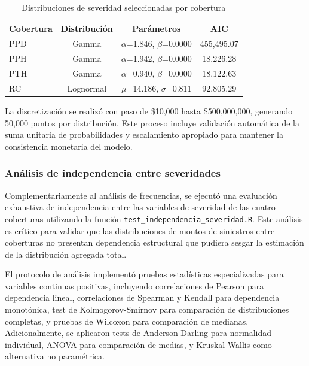 \begin{table}[H]
\centering
\caption{Distribuciones de severidad seleccionadas por cobertura}
\begin{tabular}{lccc}
\hline
\textbf{Cobertura} & \textbf{Distribución} & \textbf{Parámetros} & \textbf{AIC} \\
\hline
PPD & Gamma & $\alpha$=1.846, $\beta$=0.0000 & 455,495.07 \\
PPH & Gamma & $\alpha$=1.942, $\beta$=0.0000 & 18,226.28 \\
PTH & Gamma & $\alpha$=0.940, $\beta$=0.0000 & 18,122.63 \\
RC & Lognormal & $\mu$=14.186, $\sigma$=0.811 & 92,805.29 \\
\hline
\end{tabular}
\end{table}

La discretización se realizó con paso de \$10,000 hasta \$500,000,000, generando 50,000 puntos por distribución. Este proceso incluye validación automática de la suma unitaria de probabilidades y escalamiento apropiado para mantener la consistencia monetaria del modelo.

\subsubsection{Análisis de independencia entre severidades}

Complementariamente al análisis de frecuencias, se ejecutó una evaluación exhaustiva de independencia entre las variables de severidad de las cuatro coberturas utilizando la función \texttt{test\_independencia\_severidad.R}. Este análisis es crítico para validar que las distribuciones de montos de siniestros entre coberturas no presentan dependencia estructural que pudiera sesgar la estimación de la distribución agregada total.

El protocolo de análisis implementó pruebas estadísticas especializadas para variables continuas positivas, incluyendo correlaciones de Pearson para dependencia lineal, correlaciones de Spearman y Kendall para dependencia monotónica, test de Kolmogorov-Smirnov para comparación de distribuciones completas, y pruebas de Wilcoxon para comparación de medianas. Adicionalmente, se aplicaron tests de Anderson-Darling para normalidad individual, ANOVA para comparación de medias, y Kruskal-Wallis como alternativa no paramétrica.


